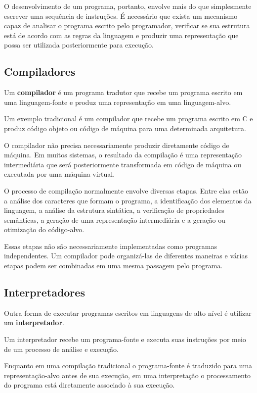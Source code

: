 \documentclass[
  brazilian,
  letterpaper,
]{book}
\theoremstyle{plain}
\theoremstyle{definition}
\theoremstyle{remark}
\begin{document}
O desenvolvimento de um programa, portanto, envolve mais do que
simplesmente escrever uma sequência de instruções. É necessário que
exista um mecanismo capaz de analisar o programa escrito pelo
programador, verificar se sua estrutura está de acordo com as regras da
linguagem e produzir uma representação que possa ser utilizada
posteriormente para execução.

\subsection{Compiladores}\label{compiladores}

Um \textbf{compilador} é um programa tradutor que recebe um programa
escrito em uma linguagem-fonte e produz uma representação em uma
linguagem-alvo.

Um exemplo tradicional é um compilador que recebe um programa escrito em
C e produz código objeto ou código de máquina para uma determinada
arquitetura.

O compilador não precisa necessariamente produzir diretamente código de
máquina. Em muitos sistemas, o resultado da compilação é uma
representação intermediária que será posteriormente transformada em
código de máquina ou executada por uma máquina virtual.

O processo de compilação normalmente envolve diversas etapas. Entre elas
estão a análise dos caracteres que formam o programa, a identificação
dos elementos da linguagem, a análise da estrutura sintática, a
verificação de propriedades semânticas, a geração de uma representação
intermediária e a geração ou otimização do código-alvo.

Essas etapas não são necessariamente implementadas como programas
independentes. Um compilador pode organizá-las de diferentes maneiras e
várias etapas podem ser combinadas em uma mesma passagem pelo programa.

\subsection{Interpretadores}\label{interpretadores}

Outra forma de executar programas escritos em linguagens de alto nível é
utilizar um \textbf{interpretador}.

Um interpretador recebe um programa-fonte e executa suas instruções por
meio de um processo de análise e execução.

Enquanto em uma compilação tradicional o programa-fonte é traduzido para
uma representação-alvo antes de sua execução, em uma interpretação o
processamento do programa está diretamente associado à sua execução.
\end{document}
